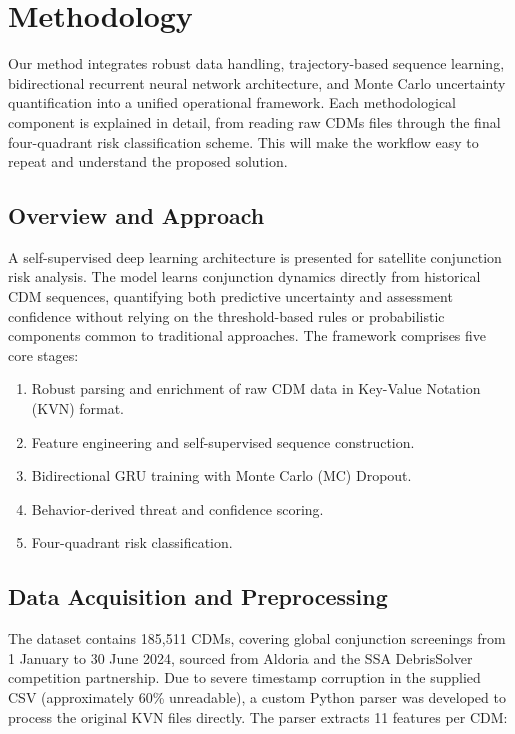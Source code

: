 \documentclass[12pt, a4paper]{article}
\begin{document}
\section{Methodology}

Our method integrates robust data handling, trajectory-based sequence learning, bidirectional recurrent neural network architecture, and Monte Carlo uncertainty quantification into a unified operational framework. Each methodological component is explained in detail, from reading raw CDMs files through the final four-quadrant risk classification scheme. This will make the workflow easy to repeat and understand the proposed solution.

\subsection{Overview and Approach}

A self-supervised deep learning architecture is presented for satellite conjunction risk analysis. The model learns conjunction dynamics directly from historical CDM sequences, quantifying both predictive uncertainty and assessment confidence without relying on the threshold-based rules or probabilistic components common to traditional approaches. The framework comprises five core stages:

\begin{enumerate}
    \item Robust parsing and enrichment of raw CDM data in Key-Value Notation (KVN) format.
    \item Feature engineering and self-supervised sequence construction.
    \item Bidirectional GRU training with Monte Carlo (MC) Dropout.
    \item Behavior-derived threat and confidence scoring.
    \item Four-quadrant risk classification.
\end{enumerate}

\subsection{Data Acquisition and Preprocessing}

The dataset contains 185,511 CDMs, covering global conjunction screenings from 1 January to 30 June 2024, sourced from Aldoria and the SSA DebrisSolver competition partnership. Due to severe timestamp corruption in the supplied CSV (approximately 60\% unreadable), a custom Python parser was developed to process the original KVN files directly. The parser extracts 11 features per CDM:
\end{document}
